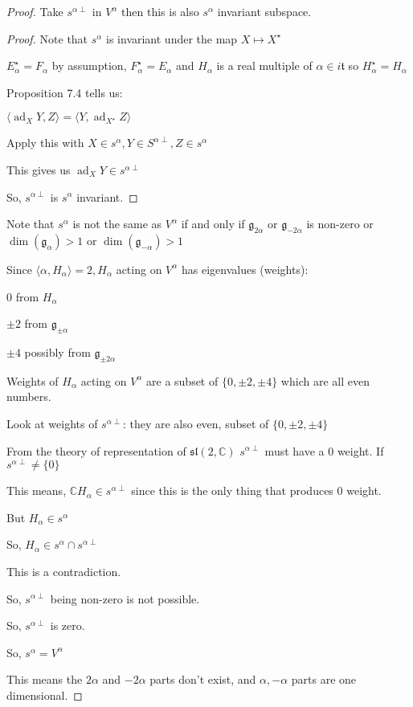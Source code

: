 \documentclass{article}
\theoremstyle{definition}
\begin{document}
\begin{proof}
Take \(s^{\alpha \perp} \) in \(V^\alpha\) then this is also \(s^\alpha \) invariant subspace.

\begin{proof}
    Note that \(s^\alpha\) is invariant under the map \(X \mapsto X^{\star} \) 

    \(E_\alpha ^{\star} =F_\alpha \) by assumption, \(F_\alpha ^{\star} =E_\alpha \) and \(H_\alpha \) is a real multiple of \(\alpha \in i \mathfrak{t} \) so \(H_\alpha ^{\star} =H_\alpha \) 

    Proposition 7.4 tells us:

    \(\langle \operatorname{ad}_X Y,Z  \rangle = \langle Y,\operatorname{ad}_{X^{\star} } Z \rangle \) 

    Apply this with \(X\in s^\alpha , Y\in S^{\alpha \perp}, Z\in s^\alpha \) 

    This gives us \(\operatorname{ad}_X Y\in s^{\alpha \perp} \) 

    So, \(s^{\alpha \perp}\) is \(s^\alpha \) invariant.

\end{proof}

Note that \(s^\alpha \) is not the same as \(V^\alpha \) if and only if \(\mathfrak{g}_{2\alpha } \) or \(\mathfrak{g}_{-2\alpha} \) is non-zero or \(\operatorname{\dim }(\mathfrak{g}_\alpha ) > 1 \)  or \(\operatorname{\dim }(\mathfrak{g}_{-\alpha} )  > 1\) 

Since \(\langle \alpha ,H_\alpha  \rangle = 2, H_\alpha \) acting on \(V^\alpha \) has eigenvalues (weights):

\(0\) from \(H_\alpha \) 

\(\pm 2\) from \(\mathfrak{g}_{\pm \alpha} \) 

\(\pm 4\) possibly from \(\mathfrak{g}_{\pm 2\alpha } \) 

Weights of \(H_\alpha \) acting on \(V^\alpha \) are a subset of \(\{ 0,\pm 2,\pm 4 \} \) which are all even numbers.

Look at weights of \(s^{\alpha \perp}\): they are also even, subset of \(\{ 0,\pm 2,\pm 4 \} \) 

From the theory of representation of \(\mathfrak{sl} (2,\mathbb{C} )\) \(s^{\alpha \perp}\) must have a \(0\) weight. If \(s^{\alpha \perp} \neq  \{ 0 \} \) 

This means, \(\mathbb{C} H_\alpha \in s^{\alpha \perp}\) since this is the only thing that produces \(0\) weight.

But \(H_\alpha \in s^\alpha\) 

So, \(H_\alpha \in s^\alpha \cap s^{\alpha \perp}\) 

This is a contradiction.

So, \(s^{\alpha \perp}\) being non-zero is not possible.

So, \(s^{\alpha \perp}\) is zero.

So, \(s^\alpha = V^\alpha \) 

This means the \(2\alpha \) and \(-2\alpha \) parts don't exist, and \(\alpha ,-\alpha \) parts are one dimensional.

\end{proof}
\end{document}
